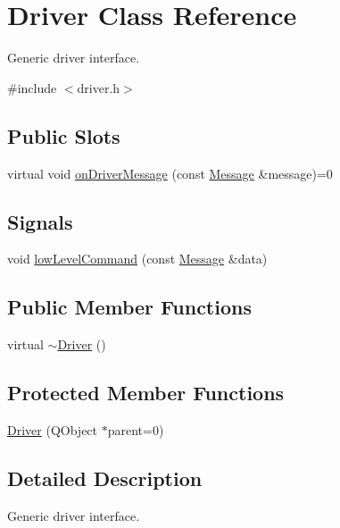 \hypertarget{classDriver}{
\section{Driver Class Reference}
\label{classDriver}
}


Generic driver interface.  




{\ttfamily \#include $<$driver.h$>$}

\subsection*{Public Slots}
\begin{DoxyCompactItemize}
\item 
virtual void \hyperlink{classDriver_af85a17da0276d26134cf02fb58063c38}{onDriverMessage} (const \hyperlink{classMessage}{Message} \&message)=0
\end{DoxyCompactItemize}
\subsection*{Signals}
\begin{DoxyCompactItemize}
\item 
void \hyperlink{classDriver_ae74285ffd8852815b1758950ccba7e96}{lowLevelCommand} (const \hyperlink{classMessage}{Message} \&data)
\end{DoxyCompactItemize}
\subsection*{Public Member Functions}
\begin{DoxyCompactItemize}
\item 
virtual \hyperlink{classDriver_ac7645eea8d3ce2bc39ddbda5e840297a}{$\sim$Driver} ()
\end{DoxyCompactItemize}
\subsection*{Protected Member Functions}
\begin{DoxyCompactItemize}
\item 
\hyperlink{classDriver_ad74d5b3e9b8f25e10f81d145a5fb316b}{Driver} (QObject $\ast$parent=0)
\end{DoxyCompactItemize}


\subsection{Detailed Description}
Generic driver interface. 

